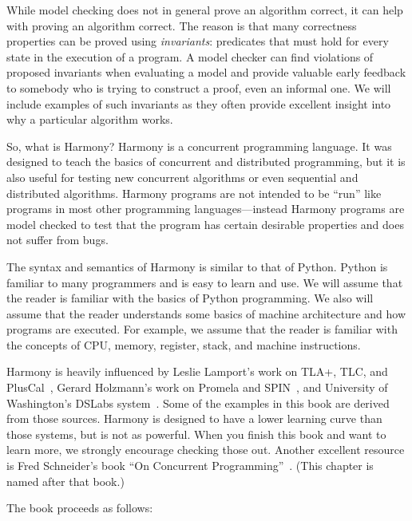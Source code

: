 \documentclass{report}
\begin{document}
%

While model checking does not in general prove an algorithm correct,
it can help with proving an algorithm correct.
The reason is that many correctness properties can be proved using
\emph{invariants}:
%
predicates that must hold for every state in the
execution of a program.  A model checker can find violations of
proposed invariants when evaluating a model and provide valuable early
feedback to somebody who is trying to construct a proof, even an
informal one.
We will include examples
of such invariants as they often provide excellent insight into
why a particular algorithm works.

So, what is Harmony?
Harmony is a concurrent programming language.  It was designed to teach
the basics of concurrent and distributed programming, but it is also useful for
testing new concurrent algorithms or even sequential and distributed
algorithms.  Harmony programs are not intended to be ``run'' like programs
in most other programming languages---instead Harmony programs are
model checked to test that the program has certain desirable
properties and does not suffer from bugs.

The syntax and semantics of Harmony is similar to that of Python.
Python is familiar to many programmers and is easy to learn and
use.  We will assume that the reader is familiar with the basics
of Python programming.  We also will assume that the reader
understands some basics of machine architecture and how programs
are executed.  For example, we assume that the reader is familiar
with the concepts of CPU, memory, register, stack, and machine
instructions.

Harmony is heavily influenced by Leslie Lamport's work on
TLA+, TLC, and PlusCal~\cite{Lamport02, Lamport09},
Gerard Holzmann's work on Promela and SPIN~\cite{SPIN},
and University of Washington's DSLabs system~\cite{MWA19}.
Some of the examples in this book are derived from those sources.
Harmony is designed to have a lower learning curve than those
systems, but is not as powerful.  When you finish this book
and want to learn more, we strongly encourage checking
those out.
Another excellent resource is Fred Schneider's book ``On
Concurrent Programming''~\cite{Schneider97}.
(This chapter is named after that book.)

The book proceeds as follows:
\end{document}
